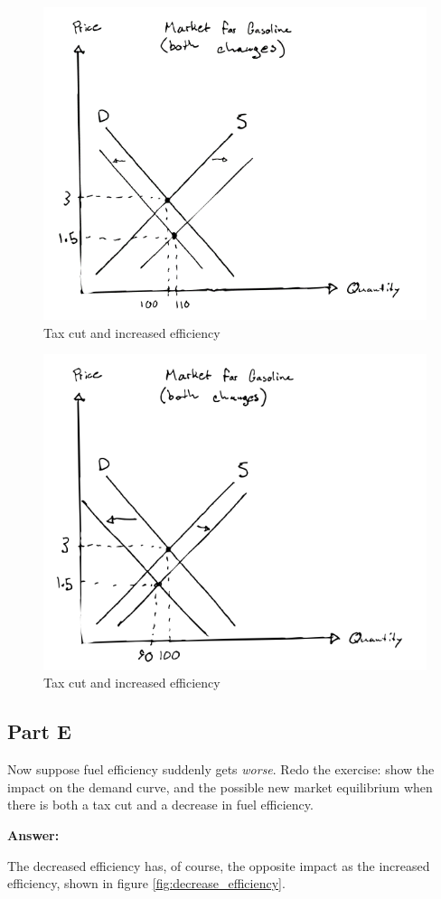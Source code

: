 \documentclass[12pt]{article}
\begin{document}
    \begin{figure}
        \centering
        \includegraphics[width=.6\textwidth]{both_changes_1a.png}
        \caption{Tax cut and increased efficiency}
        \label{fig:both_changes_1a}
    \end{figure}

    \begin{figure}
        \centering
        \includegraphics[width=.6\textwidth]{both_changes_1b.png}
        \caption{Tax cut and increased efficiency}
        \label{fig:both_changes_1b}
    \end{figure}

\subsection*{Part E}
Now suppose fuel efficiency suddenly gets \textit{worse}. Redo the exercise: show the impact on the demand curve, and the possible new market equilibrium when there is both a tax cut and a decrease in fuel efficiency.

\textbf{Answer:}

The decreased efficiency has, of course, the opposite impact as the increased efficiency, shown in figure \ref{fig:decrease_efficiency}. 
\end{document}
